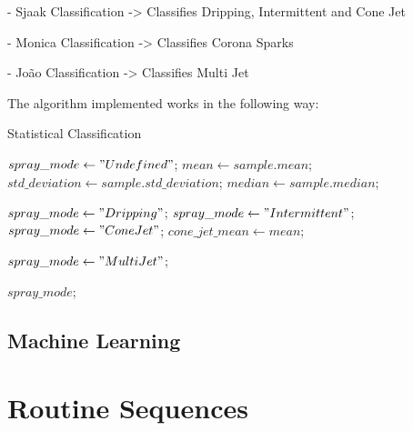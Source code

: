         - Sjaak Classification -> Classifies Dripping, Intermittent and Cone Jet
        
        - Monica Classification -> Classifies Corona Sparks

        - João Classification -> Classifies Multi Jet

	The algorithm implemented works in the following way:
	\begin{algorithm}
        \caption{Statistical Classification}\label{alg:statistical_class}
        \begin{algorithmic}

            \State $spray\_mode \gets "Undefined"$;
            \State $mean \gets sample.mean$; 
            \State $std\_deviation \gets sample.std\_deviation$;
            \State $median \gets sample.median$;
            
                \State $spray\_mode \gets "Dripping"$;
                \State $spray\_ mode \gets "Intermittent"$;
                \State $spray\_ mode \gets "Cone Jet"$;
                \State $cone\_jet\_mean \gets mean$;
            \EndIf

            \EndIf

                    \State $spray\_ mode \gets "Multi Jet"$;
                \EndIf
            \EndIf

            \Return $spray\_ mode$;
        \EndFunction
        \end{algorithmic}
    \end{algorithm}


\subsection{Machine Learning}


\section{Routine Sequences}
\label{sec:routine_sequences}

